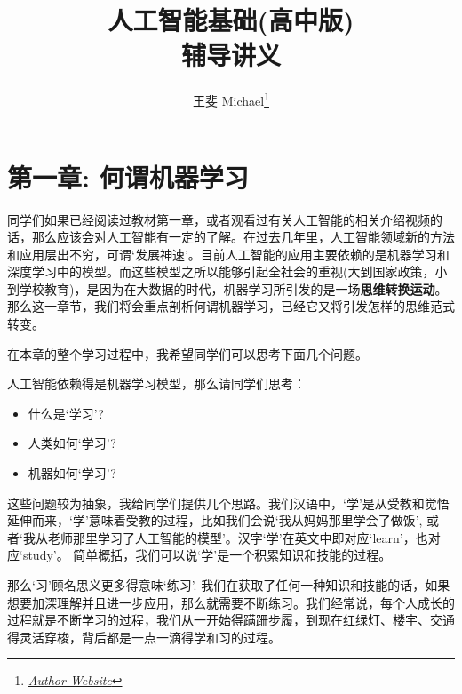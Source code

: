 \documentclass[12pt]{article}
\title{{\Huge 人工智能基础(高中版)}\\{\Large{辅导讲义}}}
\author{王斐 Michael\footnote{\href{https://www.michaelyunfei.com}{\textit{Author Website}}}}
\affiliation{Team of Education, SenseTime}
\numberwithin{figure}{section}
\numberwithin{equation}{section}
\begin{document}
  \maketitle
  \flushbottom
  \newpage
  \pagestyle{fancynotes}







\part*{第一章: 何谓机器学习}

同学们如果已经阅读过教材第一章，或者观看过有关人工智能的相关介绍视频的话，那么应该会对人工智能有一定的了解。在过去几年里，人工智能领域新的方法和应用层出不穷，可谓`发展神速'。目前人工智能的应用主要依赖的是机器学习和深度学习中的模型。而这些模型之所以能够引起全社会的重视(大到国家政策，小到学校教育)，是因为在大数据的时代，机器学习所引发的是一场\textbf{思维转换运动}。那么这一章节，我们将会重点剖析何谓机器学习，已经它又将引发怎样的思维范式转变。


在本章的整个学习过程中，我希望同学们可以思考下面几个问题。

\begin{tcolorbox}[title=本章思考问题]
	人工智能依赖得是机器学习模型，那么请同学们思考：
	\begin{itemize}
		\item 什么是`学习'?
		\item 人类如何`学习'?
		\item 机器如何`学习'?
	\end{itemize}
\end{tcolorbox}

这些问题较为抽象，我给同学们提供几个思路。我们汉语中，`学'是从受教和觉悟延伸而来，`学’意味着受教的过程，比如我们会说`我从妈妈那里学会了做饭', 或者`我从老师那里学习了人工智能的模型'。汉字`学’在英文中即对应`learn'，也对应`study'。 简单概括，我们可以说`学'是一个积累知识和技能的过程。

那么`习’顾名思义更多得意味`练习'. 我们在获取了任何一种知识和技能的话，如果想要加深理解并且进一步应用，那么就需要不断练习。我们经常说，每个人成长的过程就是不断学习的过程，我们从一开始得蹒跚步履，到现在红绿灯、楼宇、交通得灵活穿梭，背后都是一点一滴得学和习的过程。
\end{document}
